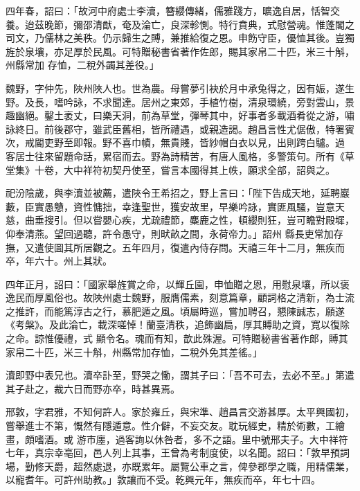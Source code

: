 \begin{pinyinscope}
 四年春，詔曰：「故河中府處士李瀆，簪纓傳緒，儒雅踐方，曠逸自居，恬智交養。迨茲晚節，彌邵清猷，奄及淪亡，良深軫惻。特行賁典，式慰營魂。惟蓬閣之司文，乃儒林之美秩。仍示歸生之賻，兼推給復之恩。申飭守臣，優恤其後。豈獨旌於泉壤，亦足厚於民風。可特贈秘書省著作佐郎，賜其家帛二十匹，米三十斛，州縣常加
 存恤，二稅外蠲其差役。」



 魏野，字仲先，陜州陜人也。世為農。母嘗夢引袂於月中承兔得之，因有娠，遂生野。及長，嗜吟詠，不求聞達。居州之東郊，手植竹樹，清泉環繞，旁對雲山，景趣幽絕。鑿土袤丈，曰樂天洞，前為草堂，彈琴其中，好事者多載酒肴從之游，嘯詠終日。前後郡守，雖武臣舊相，皆所禮遇，或親造謁。趙昌言性尤倨傲，特署賓次，戒閽吏野至即報。野不喜巾幘，無貴賤，皆紗帽白衣以見，出則跨白驢。過
 客居士往來留題命話，累宿而去。野為詩精苦，有唐人風格，多警策句。所有《草堂集》十卷，大中祥符初契丹使至，嘗言本國得其上帙，願求全部，詔與之。



 祀汾陰歲，與李瀆並被薦，遣陜令王希招之，野上言曰：「陛下告成天地，延聘巖藪，臣實愚戇，資性慵拙，幸逢聖世，獲安故里，早樂吟詠，實匪風騷，豈意天慈，曲垂搜引。但以嘗嬰心疾，尤疏禮節，麋鹿之性，頓纓則狂，豈可瞻對殿墀，仰奉清燕。望回過聽，許令愚守，則畎畝之間，永荷帝力。」詔州
 縣長吏常加存撫，又遣使圖其所居觀之。五年四月，復遣內侍存問。天禧三年十二月，無疾而卒，年六十。州上其狀。



 四年正月，詔曰：「國家舉旌賞之命，以輝丘園，申恤贈之恩，用慰泉壤，所以褒逸民而厚風俗也。故陜州處士魏野，服膺儒素，刻意篇章，顧詞格之清新，為士流之推許，而能篤淳古之行，慕肥遁之風。頃屬時巡，嘗加聘召，懇陳誠志，願遂《考槃》。及此淪亡，載深嗟悼！蘭臺清秩，追飾幽扃，厚其賻助之資，寬以復除之命。諒惟優禮，式
 顯令名。魂而有知，歆此殊渥。可特贈秘書省著作郎，賻其家帛二十匹，米三十斛，州縣常加存恤，二稅外免其差徭。」



 瀆即野中表兄也。瀆卒訃至，野哭之慟，謂其子曰：「吾不可去，去必不至。」第遣其子赴之，裁六日而野亦卒，時甚異焉。



 邢敦，字君雅，不知何許人。家於雍丘，與宋準、趙昌言交游甚厚。太平興國初，嘗舉進士不第，慨然有隱遁意。性介僻，不妄交友。耽玩經史，精於術數，工繪畫，頗嗜酒。或
 游市廛，過客詢以休咎者，多不之語。里中號邢夫子。大中祥符七年，真宗幸亳回，邑人列上其事，王曾為考制度使，以名聞。詔曰：「敦早預詞場，勤修天爵，超然處退，亦既累年。屬覽公車之言，俾參郡學之職，用精儒業，以寵耆年。可許州助教。」敦讓而不受。乾興元年，無疾而卒，年七十四。




\end{pinyinscope}
